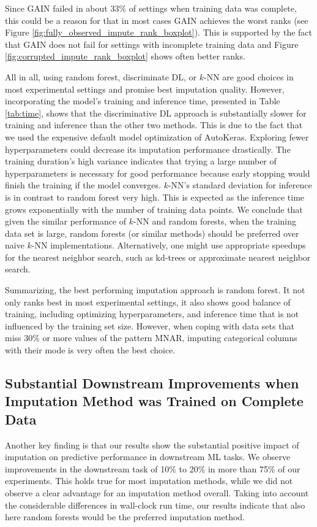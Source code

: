 Since GAIN failed in about $33\%$ of settings when training data was complete, this could be a reason for that in most cases GAIN achieves the worst ranks (see Figure \ref{fig:fully_observed_impute_rank_boxplot}). This is supported by the fact that GAIN does not fail for settings with incomplete training data and Figure \ref{fig:corrupted_impute_rank_boxplot} shows often better ranks.

All in all, using random forest, discriminate DL, or $k$-NN are good choices in most experimental settings and promise best imputation quality. However, incorporating the model's training and inference time, presented in Table \ref{tab:time}, shows that the discriminative DL approach is substantially slower for training and inference than the other two methods. This is due to the fact that we used the expensive default model optimization of AutoKeras. Exploring fewer hyperparameters could decrease its imputation performance drastically. The training duration's high variance indicates that trying a large number of hyperparameters is necessary for good performance because early stopping would finish the training if the model converges. $k$-NN's standard deviation for inference is in contrast to random forest very high. This is expected as the inference time grows exponentially with the number of training data points. We conclude that given the similar performance of $k$-NN and random forests, when the training data set is large, random forests (or similar methods) should be preferred over naive $k$-NN implementations. Alternatively, one might use appropriate speedups for the nearest neighbor search, such as kd-trees or approximate nearest neighbor search.

Summarizing, the best performing imputation approach is random forest. It not only ranks best in most experimental settings, it also shows good balance of training, including optimizing hyperparameters, and inference time that is not influenced by the training set size. However, when coping with data sets that miss $30\%$ or more values of the pattern MNAR, imputing categorical columns with their mode is very often the best choice.


\subsection{Substantial Downstream Improvements when Imputation Method was Trained on Complete Data}
%
Another key finding is that our results show the substantial positive impact of imputation on predictive performance in downstream ML tasks. We observe improvements in the downstream task of 10\% to 20\% in more than 75\% of our experiments. This holds true for most imputation methods, while we did not observe a clear advantage for an imputation method overall. Taking into account the considerable differences in wall-clock run time, our results indicate that also here random forests would be the preferred imputation method.

